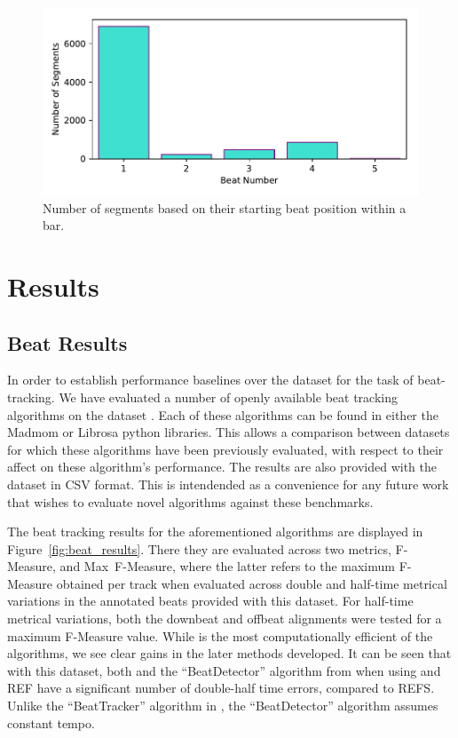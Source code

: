 \documentclass{article}
\begin{document}
\begin{figure}
    \centerline{\includegraphics[width=\columnwidth]{figs/Downbeat_Segment_Alignment.pdf}}
    \caption{Number of segments based on their starting beat position within a bar.}
    \label{fig:downbeat_segment}
\end{figure}

\section{Results}\label{sec:results}

\subsection{Beat Results}

In order to establish performance baselines over the dataset for the task of beat-tracking. We have evaluated a number of openly available beat
tracking algorithms on the dataset \cite{Ellis2007, Krebs2015, Korzeniowski2014, Bock2011}. Each of these algorithms can be found in either the
Madmom \cite{Bock2016b} or Librosa \cite{Mcfee2015a} python libraries. This allows a comparison between datasets for which these algorithms have been previously evaluated,
with respect to their affect on these algorithm's performance. The results are also provided with the dataset in CSV format. This is intendended
as a convenience for any future work that wishes to evaluate novel algorithms against these benchmarks.

The beat tracking results for the aforementioned algorithms are displayed in Figure~\ref{fig:beat_results}. There they are evaluated across two metrics,
F-Measure, and Max~F-Measure, where the latter refers to the maximum F-Measure obtained per track when evaluated across double and half-time metrical variations
in the annotated beats provided with this dataset. For half-time metrical variations, both the downbeat and offbeat alignments were tested for a maximum F-Measure
value. While \cite{Ellis2007} is the most computationally efficient of the algorithms, we see clear gains in the later methods developed. It can be seen that with 
this dataset, both \cite{Ellis2007} and the ``BeatDetector'' algorithm from \cite{Bock2011} when using  and REF have a significant number of double-half time errors, compared to REFS.
Unlike the ``BeatTracker'' algorithm in \cite{Bock2011}, the ``BeatDetector'' algorithm assumes constant tempo.
\end{document}
